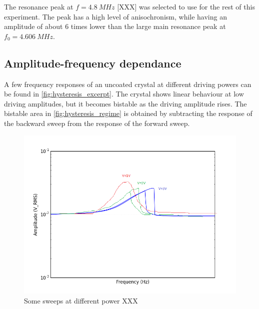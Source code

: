 The resonance peak at $f = \SI{4.8}{MHz}$ [XXX] was selected to use for the rest of this experiment. The peak has a high level of anisochronism, while having an amplitude of about 6 times lower than the large main resonance peak at $f_0 = \SI{4.606}{MHz}$. 

\subsection{Amplitude-frequency dependance}

A few frequency responses of an uncoated crystal at different driving powers can be found in \autoref{fig:hysteresis_excerpt}. The crystal shows linear behaviour at low driving amplitudes, but it becomes bistable as the driving amplitude rises. The bistable area in \autoref{fig:hysteresis_regime} is obtained by subtracting the response of the backward sweep from the response of the forward sweep. 

\begin{figure}
	\centering
		\includegraphics[width=\textwidth]{figures/hysteresis_excerpt.png}
	\caption{Some sweeps at different power XXX}
	\label{fig:hysteresis_excerpt}
\end{figure}

